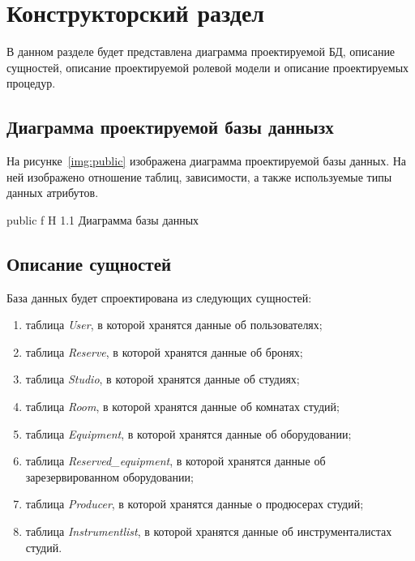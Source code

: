 \chapter{Конструкторский раздел}

В данном разделе будет представлена диаграмма проектируемой БД, описание сущностей, описание проектируемой ролевой модели и описание проектируемых процедур.

\section{Диаграмма проектируемой базы даннызх}
На рисунке~\ref{img:public} изображена диаграмма проектируемой базы данных.
На ней изображено отношение таблиц, зависимости, а также используемые типы данных атрибутов.




{public} %
{f} %
{H} %
{1.1\textwidth} %
{Диаграмма базы данных} %


\section{Описание сущностей}
База данных будет спроектирована из следующих сущностей:
\begin{enumerate}
	\item таблица \textit{User}, в которой хранятся данные об пользователях;
	\item таблица \textit{Reserve}, в которой хранятся данные об бронях;
	\item таблица \textit{Studio}, в которой хранятся данные об студиях;
	\item таблица \textit{Room}, в которой хранятся данные об комнатах студий;
	\item таблица \textit{Equipment}, в которой хранятся данные об оборудовании;
	\item таблица \textit{Reserved\_equipment}, в которой хранятся данные об зарезервированном оборудовании;
	\item таблица \textit{Producer}, в которой хранятся данные о продюсерах студий;
	\item таблица \textit{Instrumentlist}, в которой хранятся данные об инструменталистах студий.
\end{enumerate}
